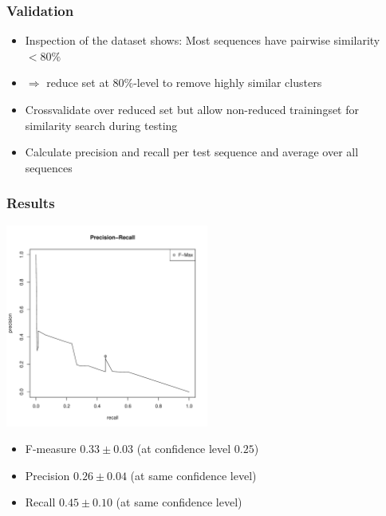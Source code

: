 \documentclass{beamer}
\begin{document}
\begin{frame}
	\frametitle{Validation}
	
	\begin{itemize}
		\item Inspection of the dataset shows: Most sequences have pairwise similarity $< 80\%$
		\item[] $\Rightarrow$ reduce set at $80\%$-level to remove highly similar clusters
		\item Crossvalidate over reduced set but allow non-reduced trainingset for similarity search during testing
		\item Calculate precision and recall per test sequence and average over all sequences
	\end{itemize}
\end{frame}

\begin{frame}
	\frametitle{Results}
	\begin{center}
	\includegraphics[width=0.5\textwidth]{PreRec_5_folds.pdf}
	\end{center}
	\begin{itemize}
		\item F-measure $0.33\pm0.03$ (at confidence level $0.25$)
		\item Precision $0.26\pm0.04$ (at same confidence level)
		\item Recall  $0.45\pm0.10$ (at same confidence level)
	\end{itemize}		
	
\end{frame}
\end{document}

